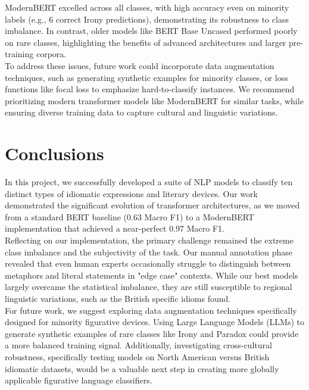\documentclass[11pt]{article}
\begin{document}
ModernBERT excelled across all classes, with high accuracy even on minority labels (e.g., 6 correct Irony predictions), demonstrating its robustness to class imbalance. In contrast, older models like BERT Base Uncased performed poorly on rare classes, highlighting the benefits of advanced architectures and larger pre-training corpora. \\

To address these issues, future work could incorporate data augmentation techniques, such as generating synthetic examples for minority classes, or loss functions like focal loss to emphasize hard-to-classify instances. We recommend prioritizing modern transformer models like ModernBERT for similar tasks, while ensuring diverse training data to capture cultural and linguistic variations. \\

\section{Conclusions}

In this project, we successfully developed a suite of NLP models to classify ten distinct types of idiomatic expressions and literary devices. Our work demonstrated the significant evolution of transformer architectures, as we moved from a standard BERT baseline (0.63 Macro F1) to a ModernBERT implementation that achieved a near-perfect 0.97 Macro F1. \\

Reflecting on our implementation, the primary challenge remained the extreme class imbalance and the subjectivity of the task. Our manual annotation phase revealed that even human experts occasionally struggle to distinguish between metaphors and literal statements in "edge case" contexts. While our best models largely overcame the statistical imbalance, they are still susceptible to regional linguistic variations, such as the British specific idioms found. \\

For future work, we suggest exploring data augmentation techniques specifically designed for minority figurative devices. Using Large Language Models (LLMs) to generate synthetic examples of rare classes like Irony and Paradox could provide a more balanced training signal. Additionally, investigating cross-cultural robustness, specifically testing models on North American versus British idiomatic datasets, would be a valuable next step in creating more globally applicable figurative language classifiers. \\
\end{document}
